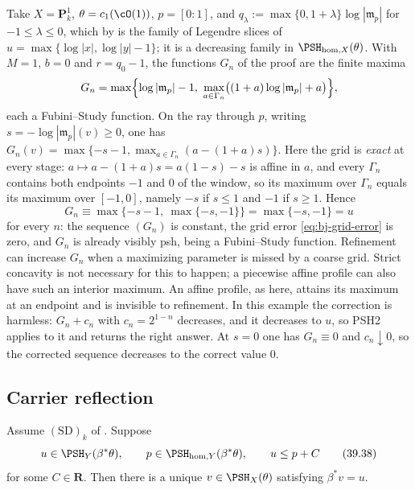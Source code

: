 \begin{example}
\label{ex:ch39-grid-correction-needed}
Take $X=\mathbf P^1_k$, $\theta=c_1(\cO(1))$, $p=[0:1]$, and
$q_\lambda:=\max\{0,1+\lambda\}\log|\mathfrak m_p|$ for
$-1\le\lambda\le0$, which by  is the family
of Legendre slices of $u=\max\{\log|x|,\log|y|-1\}$; it is a decreasing
family in $\PSH_{\mathrm{hom},X}(\theta)$.  With $M=1$, $b=0$ and
$r=q_0-1$, the functions $G_n$ of the proof are the finite maxima
\[
 G_n=\max\Bigl\{\log|\mathfrak m_p|-1,\
 \max_{a\in\Gamma_n}\bigl((1+a)\log|\mathfrak m_p|+a\bigr)\Bigr\},
\]
each a Fubini--Study function.  On the ray through $p$, writing
$s=-\log|\mathfrak m_p|(v)\ge0$, one has
$G_n(v)=\max\{-s-1,\max_{a\in\Gamma_n}(a-(1+a)s)\}$.  Here the grid is
\emph{exact} at every stage: $a\mapsto a-(1+a)s=a(1-s)-s$ is affine in
$a$, and every $\Gamma_n$ contains both endpoints $-1$ and $0$ of
the window, so its maximum over $\Gamma_n$ equals its maximum over
$[-1,0]$, namely $-s$ if $s\le1$ and $-1$ if $s\ge1$.  Hence
\[
 G_n\equiv\max\{-s-1,\ \max\{-s,-1\}\}=\max\{-s,-1\}=u
\]
for every $n$: the sequence $(G_n)$ is constant, the grid error
\eqref{eq:bj-grid-error} is zero, and $G_n$ is already visibly psh, being
a Fubini--Study function.  Refinement can increase $G_n$ when a maximizing parameter is missed
by a coarse grid.  Strict concavity is not necessary for this to happen;
a piecewise affine profile can also have such an interior maximum.
An affine profile, as here, attains its maximum at an endpoint and is
invisible to refinement.  In this example the correction is harmless: $G_n+c_n$ with $c_n=2^{1-n}$ decreases, and it decreases to
$u$, so PSH2 applies to it and returns the right answer.  At $s=0$ one
has $G_n\equiv0$ and $c_n\downarrow0$, so the corrected sequence
decreases to the correct value $0$.
\end{example}

\subsection{Carrier reflection}
\label{sec:ch39-carrier-reflection}

\begin{theorem}
\label{thm:bj-carrier-reflection}
Assume $\mathrm{(SD)}_k$ of .
Suppose
\[
 u\in\PSH_Y(\beta^*\theta),\qquad
 p\in\PSH_{\mathrm{hom},Y}(\beta^*\theta),\qquad
 u\le p+C
\tag{39.38}\label{eq:bj-carrier-reflection-hypotheses}
\]
for some $C\in\mathbf R$.  Then there is a unique
$v\in\PSH_X(\theta)$ satisfying $\beta^*v=u$.
\end{theorem}

